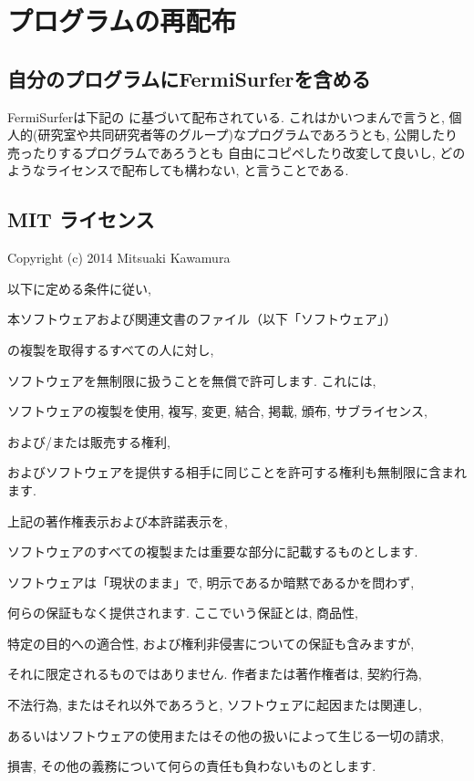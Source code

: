 \documentclass[letterpaper,10pt,dvipdfmx,openany]{sphinxmanual}
\begin{document}
\chapter{プログラムの再配布}
\label{\detokenize{copy:id1}}\label{\detokenize{copy::doc}}

\section{自分のプログラムにFermiSurferを含める}
\label{\detokenize{copy:fermisurfer}}
\sphinxAtStartPar
FermiSurferは下記の {\hyperref[\detokenize{copy:mitlicense}]{}} に基づいて配布されている.
これはかいつまんで言うと,
個人的(研究室や共同研究者等のグループ)なプログラムであろうとも,
公開したり売ったりするプログラムであろうとも
自由にコピペしたり改変して良いし,
どのようなライセンスで配布しても構わない, と言うことである.


\section{MIT ライセンス}
\label{\detokenize{copy:mit}}\label{\detokenize{copy:mitlicense}}
\begin{DUlineblock}{0em}
\item[] Copyright (c) 2014 Mitsuaki Kawamura
\item[] 
\item[] 以下に定める条件に従い,
\item[] 本ソフトウェアおよび関連文書のファイル（以下「ソフトウェア」）
\item[] の複製を取得するすべての人に対し,
\item[] ソフトウェアを無制限に扱うことを無償で許可します. これには,
\item[] ソフトウェアの複製を使用, 複写, 変更, 結合, 掲載, 頒布, サブライセンス,
\item[] および/または販売する権利,
\item[] およびソフトウェアを提供する相手に同じことを許可する権利も無制限に含まれます.
\item[] 
\item[] 上記の著作権表示および本許諾表示を,
\item[] ソフトウェアのすべての複製または重要な部分に記載するものとします.
\item[] 
\item[] ソフトウェアは「現状のまま」で, 明示であるか暗黙であるかを問わず,
\item[] 何らの保証もなく提供されます. ここでいう保証とは, 商品性,
\item[] 特定の目的への適合性, および権利非侵害についての保証も含みますが,
\item[] それに限定されるものではありません. 作者または著作権者は, 契約行為,
\item[] 不法行為, またはそれ以外であろうと, ソフトウェアに起因または関連し,
\item[] あるいはソフトウェアの使用またはその他の扱いによって生じる一切の請求,
\item[] 損害, その他の義務について何らの責任も負わないものとします.
\end{DUlineblock}
\end{document}
